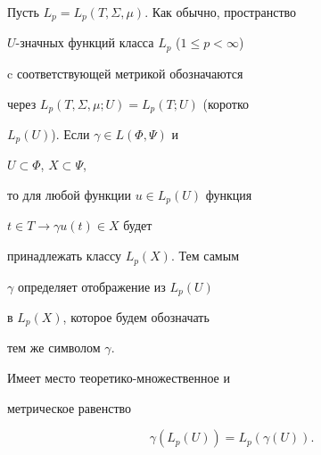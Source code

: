 







Пусть $L_p = L_p(T, \Sigma, \mu)$. Как обычно, пространство


$U$-значных функций класса $L_p$ ($1 \le p < \infty$)


c соответствующей метрикой обозначаются


через $L_p(T, \Sigma, \mu; U)=L_p(T;U)$ (коротко


$L_p(U)$). Если $\gamma \in L(\Phi, \Psi)$ и


$U \subset \Phi$, $X \subset \Psi $,


то для любой функции $u \in L_p(U)$ функция


$t \in T \rightarrow \gamma u(t) \in X$ будет


принадлежать классу $L_p(X)$. Тем самым


$\gamma$ определяет отображение из $L_p(U)$


в $L_p(X)$, которое будем обозначать


тем же символом $\gamma$.





\begin{thms} \label{Lp}


Имеет место теоретико-множественное и


метрическое равенство


$$


\gamma (L_p(U)) = L_p(\gamma (U)).


$$


\end{thms}






